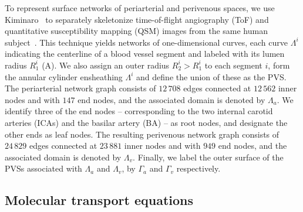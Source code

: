 \documentclass[fleqn,10pt]{wlscirep}
\begin{document}
To represent surface networks of periarterial and perivenous spaces,
we use Kiminaro~\cite{william_silversmith_2021_5539913} to separately
skeletonize time-of-flight angiography (ToF) and quantitative
susceptibility mapping (QSM) images from the same human
subject~\cite{hodneland2019new}. This technique yields networks of
one-dimensional curves, each curve $\Lambda^i$ indicating the
centerline of a blood vessel segment and labeled with its lumen radius
$R_1^i$ (A). We also assign an
outer radius $R_2^i > R_1^i$ to each segment $i$, form the annular
cylinder ensheathing $\Lambda^i$ and define the union of these as the
PVS. The periarterial network graph consists of $12\,708$ edges
connected at $12\,562$ inner nodes and with $147$ end nodes, and the
associated domain is denoted by $\Lambda_a$. We identify three of the
end nodes -- corresponding to the two internal carotid arteries (ICAs)
and the basilar artery (BA) -- as root nodes, and designate the other
ends as leaf nodes. The resulting perivenous network graph consists of
$24\,829$ edges connected at $23\,881$ inner nodes and with $949$ end nodes, and the associated domain is denoted by $\Lambda_v$. Finally, we label the outer surface of the PVSs associated with $\Lambda_a$ and $\Lambda_v$, by $\Gamma_a$ and $\Gamma_v$ respectively.

\subsection*{Molecular transport equations}
\end{document}
